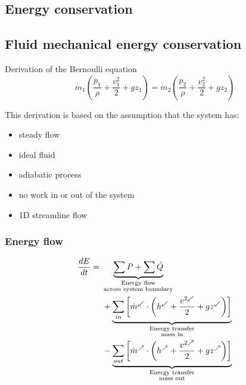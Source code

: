 \documentclass{article}
\begin{document}
\begin{multicols}{2}
\section{Energy conservation}
\subsection{Fluid mechanical energy conservation}
\begin{theorybox}{Derivation of the Bernoulli equation}
\vspace*{-0.3cm}
    \begin{equation}
        \dot{m}_1 \left(\dfrac{p_1}{\rho} + \dfrac{v_1^2}{2} + gz_1\right) = \dot{m}_2 \left(\dfrac{p_2}{\rho} + \dfrac{v_2^2}{2} + gz_2\right)
    \end{equation}

    This derivation is based on the assumption that the system has:
    
    \begin{minipage}[t]{0.48\linewidth}
        \begin{itemize}
            \item steady flow
            \item ideal fluid
            \item adiabatic process
        \end{itemize}
    \end{minipage}
    \hfill
    \begin{minipage}[t]{0.48\linewidth}
        \begin{itemize}
            \item no work in or out of the system
            \item 1D streamline flow
        \end{itemize}
    \end{minipage}
\subsubsection{Energy flow}
\vspace*{-0.5cm}
    \begin{align}
        \frac{dE}{dt} =\ 
        &\underbrace{\sum P + \sum \dot{Q}}_{
            \substack{
                \text{Energy flow} \\ \text{across system boundary}
            }
        } \notag \\
        &+ \underbrace{\sum_{in} \left[\dot{m}^{\swarrow} \cdot \left(h^{\swarrow} + \frac{v^{2\swarrow}}{2} + g z^{\swarrow}\right)\right]}_{
            \substack{
                \text{Energy transfer} \\ \text{mass in}
            }
        } \notag \\
        &- \underbrace{\sum_{out} \left[\dot{m}^{\nearrow} \cdot \left(h^{\nearrow} + \frac{v^{2\nearrow}}{2} + g z^{\nearrow}\right)\right]}_{
            \substack{
                \text{Energy transfer} \\ \text{mass out}
            }
        }
    \end{align}


\end{theorybox}
\end{multicols}
\end{document}
